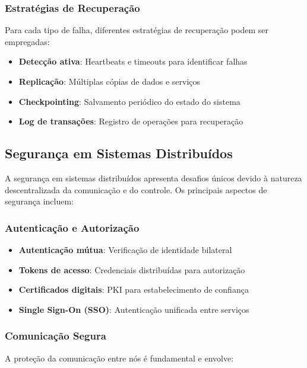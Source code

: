 \subsubsection{Estratégias de Recuperação}

Para cada tipo de falha, diferentes estratégias de recuperação podem ser empregadas:

\begin{itemize}
    \item \textbf{Detecção ativa}: Heartbeats e timeouts para identificar falhas
    \item \textbf{Replicação}: Múltiplas cópias de dados e serviços
    \item \textbf{Checkpointing}: Salvamento periódico do estado do sistema
    \item \textbf{Log de transações}: Registro de operações para recuperação
\end{itemize}

\subsection{Segurança em Sistemas Distribuídos}

A segurança em sistemas distribuídos apresenta desafios únicos devido à natureza descentralizada da comunicação e do controle. Os principais aspectos de segurança incluem:

\subsubsection{Autenticação e Autorização}

\begin{itemize}
    \item \textbf{Autenticação mútua}: Verificação de identidade bilateral
    \item \textbf{Tokens de acesso}: Credenciais distribuídas para autorização
    \item \textbf{Certificados digitais}: PKI para estabelecimento de confiança
    \item \textbf{Single Sign-On (SSO)}: Autenticação unificada entre serviços
\end{itemize}

\subsubsection{Comunicação Segura}

A proteção da comunicação entre nós é fundamental e envolve:

